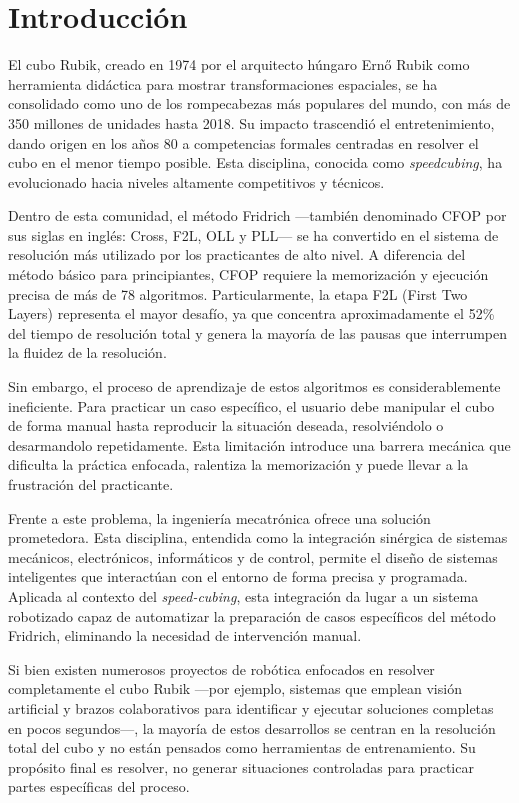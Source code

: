 \section{Introducción}
El cubo Rubik, creado en 1974 por el arquitecto húngaro Ernő Rubik como herramienta didáctica para mostrar transformaciones espaciales, se ha consolidado como uno de los rompecabezas más populares del mundo, con más de 350 millones de unidades hasta 2018\cite{Reese2020}. Su impacto trascendió el entretenimiento, dando origen en los años 80 a competencias formales centradas en resolver el cubo en el menor tiempo posible. Esta disciplina, conocida como \textit{speedcubing}, ha evolucionado hacia niveles altamente competitivos y técnicos.

Dentro de esta comunidad, el método Fridrich ---también denominado CFOP por sus siglas en inglés: Cross, F2L, OLL y PLL--- se ha convertido en el sistema de resolución más utilizado por los practicantes de alto nivel\cite{Boyce2022}. A diferencia del método básico para principiantes, CFOP requiere la memorización y ejecución precisa de más de 78 algoritmos. Particularmente, la etapa F2L (First Two Layers) representa el mayor desafío, ya que concentra aproximadamente el 52\% del tiempo de resolución total y genera la mayoría de las pausas que interrumpen la fluidez de la resolución\cite{Boyce2022}.

Sin embargo, el proceso de aprendizaje de estos algoritmos es considerablemente ineficiente. Para practicar un caso específico, el usuario debe manipular el cubo de forma manual hasta reproducir la situación deseada, resolviéndolo o desarmandolo repetidamente. Esta limitación introduce una barrera mecánica que dificulta la práctica enfocada, ralentiza la memorización y puede llevar a la frustración del practicante.

Frente a este problema, la ingeniería mecatrónica ofrece una solución prometedora. Esta disciplina, entendida como la integración sinérgica de sistemas mecánicos, electrónicos, informáticos y de control, permite el diseño de sistemas inteligentes que interactúan con el entorno de forma precisa y programada\cite{Perdomo2003}. Aplicada al contexto del \textit{speed-cubing}, esta integración da lugar a un sistema robotizado capaz de automatizar la preparación de casos específicos del método Fridrich, eliminando la necesidad de intervención manual.

Si bien existen numerosos proyectos de robótica enfocados en resolver completamente el cubo Rubik ---por ejemplo, sistemas que emplean visión artificial y brazos colaborativos para identificar y ejecutar soluciones completas en pocos segundos\cite{Gorriz2023}---, la mayoría de estos desarrollos se centran en la resolución total del cubo y no están pensados como herramientas de entrenamiento. Su propósito final es resolver, no generar situaciones controladas para practicar partes específicas del proceso.

